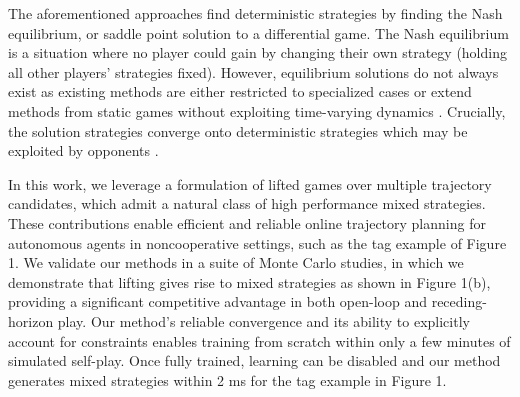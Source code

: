 The aforementioned approaches find deterministic strategies by finding the Nash equilibrium, or saddle point solution to a differential game. 
The Nash equilibrium is a situation where no player could gain by changing their own strategy (holding all other players’ strategies fixed). 
However, equilibrium solutions do not always exist as existing methods are either restricted to specialized cases or extend methods from static games without exploiting time-varying dynamics \cite{di_newtons_2019}.  
Crucially, the solution strategies converge onto deterministic strategies which may be exploited by opponents \cite{peters2022learning}. 




In this work, we leverage a formulation of lifted games over multiple trajectory candidates, which admit a natural class of high performance mixed strategies. 
These contributions enable efficient and reliable online trajectory planning for autonomous agents in noncooperative settings, such as the tag example of Figure 1. 
We validate our methods in a suite of Monte Carlo studies, in which we demonstrate that lifting gives rise to mixed strategies as shown in Figure 1(b), providing a significant competitive advantage in both open-loop and receding-horizon play. Our method’s reliable convergence and its ability to explicitly account for constraints enables training from scratch within only a few minutes of simulated self-play. 
Once fully trained, learning can be disabled and our method generates mixed strategies within 2 ms for the tag example in Figure 1.
 

